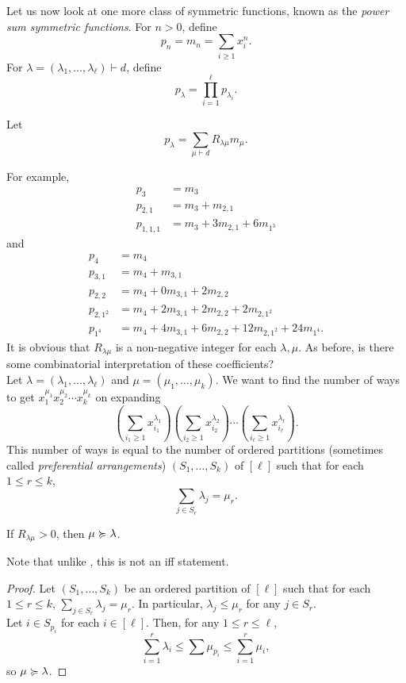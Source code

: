 
	Let us now look at one more class of symmetric functions, known as the \emph{power sum symmetric functions}. For $n > 0$, define
	\[ p_n = m_n = \sum_{i \ge 1} x_i^n. \]
	For $\lambda = (\lambda_1,\ldots,\lambda_\ell) \vdash d$, define
	\[ p_\lambda = \prod_{i=1}^\ell p_{\lambda_i}. \]

	Let
	\[ p_\lambda = \sum_{\mu \vdash d} R_{\lambda\mu} m_\mu. \]

	For example,
	\begin{align*}
		p_3 &= m_3 \\
		p_{2,1} &= m_3 + m_{2,1} \\
		p_{1,1,1} &= m_3 + 3m_{2,1} + 6m_{1^3}
	\end{align*}
	and
	\begin{align*}
		p_4 &= m_4 \\
		p_{3,1} &= m_4 + m_{3,1} \\
		p_{2,2} &= m_4 + 0m_{3,1} + 2m_{2,2} \\
		p_{2,1^2} &= m_4 + 2m_{3,1} + 2m_{2,2} + 2m_{2,1^2} \\
		p_{1^4} &= m_4 + 4m_{3,1} + 6m_{2,2} + 12m_{2,1^2} + 24m_{1^4}.
	\end{align*}
	It is obvious that $R_{\lambda\mu}$ is a non-negative integer for each $\lambda,\mu$. As before, is there some combinatorial interpretation of these coefficients?\\
	Let $\lambda = (\lambda_1,\ldots,\lambda_\ell)$ and $\mu = (\mu_1,\ldots,\mu_k)$. We want to find the number of ways to get $x_1^{\mu_1} x_2^{\mu_2} \cdots x_k^{\mu_k}$ on expanding
	\[ \left( \sum_{i_1 \ge 1} x_{i_1}^{\lambda_1} \right) \left( \sum_{i_2 \ge 1} x_{i_2}^{\lambda_2} \right) \cdots \left( \sum_{i_\ell \ge 1} x_{i_\ell}^{\lambda_\ell} \right). \]
	This number of ways is equal to the number of ordered partitions (sometimes called \emph{preferential arrangements}) $(S_1,\ldots,S_k)$ of $[\ell]$ such that for each $1 \le r \le k$,
	\[ \sum_{j \in S_r} \lambda_j = \mu_r.  \]

	\begin{ftheo}
		If $R_{\lambda\mu} > 0$, then $\mu \succcurlyeq \lambda$.
	\end{ftheo}
	Note that unlike , this is not an iff statement.
	\begin{proof}
		Let $(S_1,\ldots,S_k)$ be an ordered partition of $[\ell]$ such that for each $1 \le r \le k$, $\sum_{j \in S_r} \lambda_j = \mu_r$. In particular, $\lambda_j \le \mu_r$ for any $j \in S_r$. \\
		Let $i \in S_{p_i}$ for each $i \in [\ell]$. Then, for any $1 \le r \le \ell$,
		\[ \sum_{i=1}^r \lambda_{i} \le \sum \mu_{p_i} \le \sum_{i=1}^r \mu_{i}, \]
		so $\mu \succcurlyeq \lambda$.
	\end{proof}

